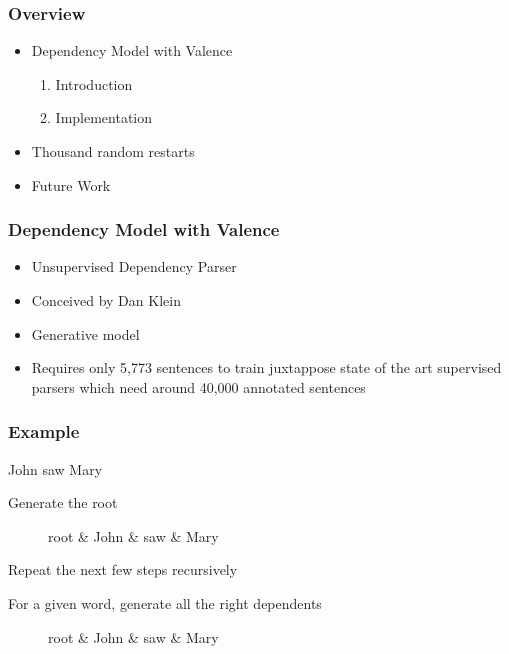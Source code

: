 \documentclass{beamer}
\begin{document}
\begin{frame}
\frametitle{Overview}

\begin{itemize}
\item Dependency Model with Valence
  \begin{enumerate}
    \item Introduction
    \item Implementation
  \end{enumerate}
\item Thousand random restarts
\item Future Work
\end{itemize}
\end{frame}

\begin{frame}
 \frametitle{Dependency Model with Valence}
   \begin{itemize}
     \item Unsupervised Dependency Parser
     \item Conceived by Dan Klein
     \item Generative model
     \item Requires only 5,773 sentences to train juxtappose state of the art supervised parsers which need around 40,000 annotated sentences
   \end{itemize}
\end{frame}

\begin{frame}
\frametitle{Example}
John saw Mary
\end{frame}

\begin{frame}
Generate the root
\begin{figure}
\centering
\begin{dependency}[theme = simple]
\begin{deptext}
root \& John \& saw \& Mary \\
\end{deptext}
\end{dependency}
\end{figure}
Repeat the next few steps recursively
\end{frame}


\begin{frame}
For a given word, generate all the right dependents
\begin{figure}
\centering
\begin{dependency}[theme = simple]
\begin{deptext}
root \& John \& saw \& Mary \\
\end{deptext}
\end{dependency}
\end{figure}
\end{frame}
\end{document}
